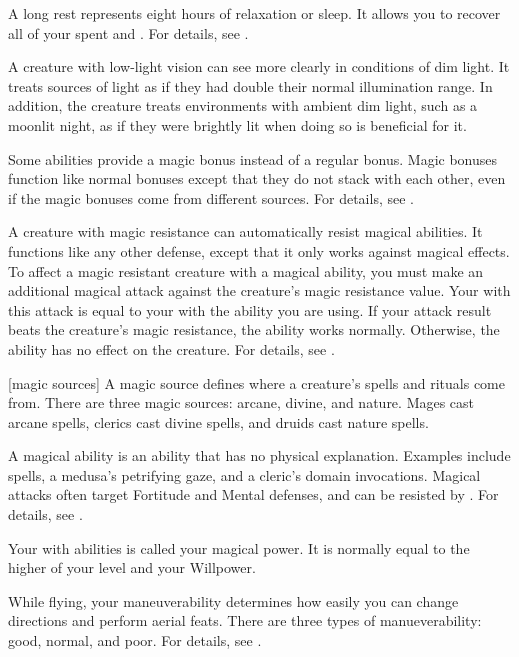  A long rest represents eight hours of relaxation or sleep.
It allows you to recover all of your spent  and .
For details, see .

 A creature with low-light vision can see more clearly in conditions of dim light.
It treats sources of light as if they had double their normal illumination range.
In addition, the creature treats environments with ambient dim light, such as a moonlit night, as if they were brightly lit when doing so is beneficial for it.

 Some abilities provide a magic bonus instead of a regular bonus.
Magic bonuses function like normal bonuses except that they do not stack with each other, even if the magic bonuses come from different sources.
For details, see .

 A creature with magic resistance can automatically resist magical abilities.
It functions like any other defense, except that it only works against magical effects.
To affect a magic resistant creature with a magical ability, you must make an additional magical attack against the creature's magic resistance value.
Your  with this attack is equal to your  with the ability you are using.
If your attack result beats the creature's magic resistance, the ability works normally.
Otherwise, the ability has no effect on the creature.
For details, see .

[magic sources] A magic source defines where a creature's spells and rituals come from.
There are three magic sources: arcane, divine, and nature.
Mages cast arcane spells, clerics cast divine spells, and druids cast nature spells.

 A magical ability is an ability that has no physical explanation.
Examples include spells, a medusa's petrifying gaze, and a cleric's domain invocations.
Magical attacks often target Fortitude and Mental defenses, and can be resisted by .
For details, see .

 Your  with  abilities is called your magical power.
It is normally equal to the higher of your level and your Willpower.

 While flying, your maneuverability determines how easily you can change directions and perform aerial feats.
There are three types of manueverability: good, normal, and poor.
For details, see .

